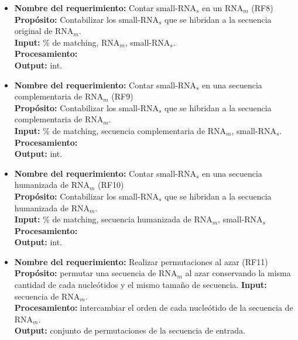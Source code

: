 \documentclass[12pt,a4paper,spanish]{article}
\begin{document}
\begin{itemize}
		\item \textbf{Nombre del requerimiento:} Contar small-RNA$_s$ en un RNA$_m$ (RF8)\\
 	    \textbf{Propósito:} Contabilizar los small-RNA$_s$ que se hibridan a la secuencia original de RNA$_m$. \\
		\textbf{Input:} \% de matching, RNA$_m$, small-RNA$_s$. \\
		\textbf{Procesamiento:} \\
		\textbf{Output:} int.\\

		\item \textbf{Nombre del requerimiento:} Contar small-RNA$_s$ en una secuencia complementaria de RNA$_m$ (RF9)\\
 	    \textbf{Propósito:} Contabilizar los small-RNA$_s$ que se hibridan a la secuencia complementaria de RNA$_m$. \\
		\textbf{Input:} \% de matching, secuencia complementaria de RNA$_m$, small-RNA$_s$. \\
		\textbf{Procesamiento:} \\
		\textbf{Output:} int.\\

		\item \textbf{Nombre del requerimiento:} Contar small-RNA$_s$ en una secuencia humanizada de RNA$_m$ (RF10)\\
 	    \textbf{Propósito:} Contabilizar los small-RNA$_s$ que se hibridan a la secuencia humanizada de RNA$_m$. \\
		\textbf{Input:} \% de matching, secuencia humanizada de RNA$_m$, small-RNA$_s$\\
		\textbf{Procesamiento:} \\
		\textbf{Output:} int. \\

		\item \textbf{Nombre del requerimiento:} Realizar permutaciones al azar (RF11)\\
 	    \textbf{Propósito:} permutar una secuencia de RNA$_m$ al azar conservando la misma cantidad de cada nucleótidos y el mismo tamaño de secuencia.
		\textbf{Input:} secuencia de RNA$_m$.\\
		\textbf{Procesamiento:} intercambiar el orden de cada nucleótido de la secuencia de RNA$_m$. \\
		\textbf{Output:} conjunto de permutaciones de la secuencia de entrada.\\


\end{itemize}
\end{document}
